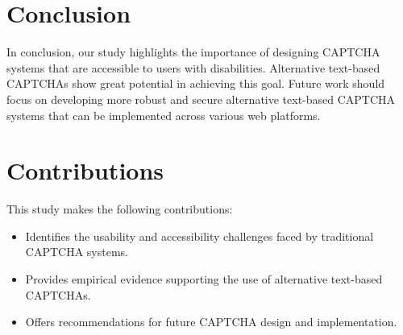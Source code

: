 \documentclass{article}
\begin{document}
\section{Conclusion}
In conclusion, our study highlights the importance of designing CAPTCHA systems that are accessible to users with disabilities. Alternative text-based CAPTCHAs show great potential in achieving this goal. Future work should focus on developing more robust and secure alternative text-based CAPTCHA systems that can be implemented across various web platforms.

\section{Contributions}
This study makes the following contributions:
\begin{itemize}
    \item Identifies the usability and accessibility challenges faced by traditional CAPTCHA systems.
    \item Provides empirical evidence supporting the use of alternative text-based CAPTCHAs.
    \item Offers recommendations for future CAPTCHA design and implementation.
\end{itemize}



\end{document}
